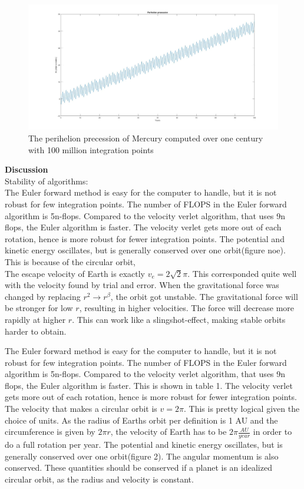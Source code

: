\documentclass[10pt,a4paper]{article}
\begin{document}
\begin{figure}
\centerline{\includegraphics[scale=0.4]{perihelion100mill.jpg}}
\caption{The perihelion precession of Mercury computed over one century with 100 million integration points}
\end{figure} 

\newpage
{\LARGE\bf
Discussion
}
\\
Stability of algorithms:\\


\noindent The Euler forward method is easy for the computer to handle, but it is not robust for few integration points. The number of FLOPS in the Euler forward algorithm is 5n-flops. Compared to the velocity verlet algorithm, that uses 9n flops, the Euler algorithm is faster. The velocity verlet gets more out of each rotation, hence is more robust for fewer integration points. The potential and kinetic energy oscillates, but is generally conserved over one orbit(figure noe). This is because of the circular orbit,  \\

\noindent The escape velocity of Earth is exactly $v_e=2\sqrt{2}\pi$. This corresponded quite well with the velocity found by trial and error. When the gravitational force was changed by replacing $r^2\rightarrow r^\beta$, the orbit got unstable. The gravitational force will be stronger for low $r$, resulting in higher velocities. The force will decrease more rapidly at higher $r$. This can work like a slingshot-effect, making stable orbits harder to obtain.  




\noindent The Euler forward method is easy for the computer to handle, but it is not robust for few integration points. The number of FLOPS in the Euler forward algorithm is 5n-flops. Compared to the velocity verlet algorithm, that uses 9n flops, the Euler algorithm is faster. This is shown in table 1. The velocity verlet gets more out of each rotation, hence is more robust for fewer integration points. The velocity that makes a circular orbit is $v=2\pi$. This is pretty logical given the choice of units. As the radius of Earths orbit per definition is 1 AU and the circumference is given by $2\pi r$, the velocity of Earth has to be $2\pi \frac{AU}{year}$ in order to do a full rotation per year. The potential and kinetic energy oscillates, but is generally conserved over one orbit(figure 2). The angular momentum is also conserved. These quantities should be conserved if a planet is an idealized circular orbit, as the radius and velocity is constant.  \\
\end{document}
